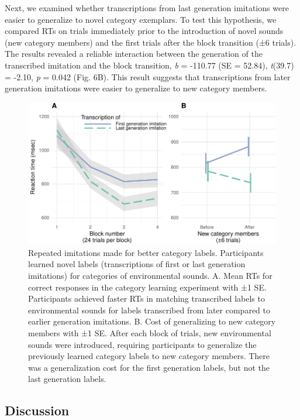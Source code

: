 \documentclass[english,floatsintext,man]{apa6}
\theoremstyle{definition}
\theoremstyle{definition}
\theoremstyle{definition}
\theoremstyle{remark}
\begin{document}
Next, we examined whether transcriptions from last generation imitations
were easier to generalize to novel category exemplars. To test this
hypothesis, we compared RTs on trials immediately prior to the
introduction of novel sounds (new category members) and the first trials
after the block transition (±6 trials). The results revealed a reliable
interaction between the generation of the transcribed imitation and the
block transition, \emph{b} = -110.77 (SE = 52.84), \emph{t}(39.7) =
-2.10, \emph{p} = 0.042 (Fig. 6B). This result suggests that
transcriptions from later generation imitations were easier to
generalize to new category members.

\begin{figure}
\centering
\includegraphics{fig6-1.pdf}
\caption{\label{fig:fig6}Repeated imitations made for better category
labels. Participants learned novel labels (transcriptions of first or
last generation imitations) for categories of environmental sounds. A.
Mean RTs for correct responses in the category learning experiment with
±1 SE. Participants achieved faster RTs in matching transcribed labels
to environmental sounds for labels transcribed from later compared to
earlier generation imitations. B. Cost of generalizing to new category
members with ±1 SE. After each block of trials, new environmental sounds
were introduced, requiring participants to generalize the previously
learned category labels to new category members. There was a
generalization cost for the first generation labels, but not the last
generation labels.}
\end{figure}

\hypertarget{discussion-2}{%
\subsection{Discussion}\label{discussion-2}}
\end{document}
